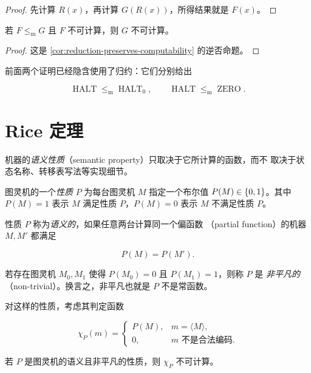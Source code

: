 \begin{proof}
  先计算 $R(x)$，再计算 $G(R(x))$，所得结果就是 $F(x)$。
\end{proof}

\begin{corollary}
  \label{cor:reduction-transfers-uncomputability}
  若 $F\leq_{\mathrm m}G$ 且 $F$ 不可计算，则 $G$ 不可计算。
\end{corollary}

\begin{proof}
  这是 \cref{cor:reduction-preserves-computability} 的逆否命题。
\end{proof}

前面两个证明已经隐含使用了归约：它们分别给出

\[
  \operatorname{HALT}\leq_{\mathrm m}\operatorname{HALT}_0,
  \qquad
  \operatorname{HALT}\leq_{\mathrm m}\operatorname{ZERO}.
\]

\section{Rice 定理}

机器的\emph{语义性质}（semantic property）只取决于它所计算的函数，而不
取决于状态名称、转移表写法等实现细节。

\begin{definition}
  \label{def:semantic-nontrivial-property}
  图灵机的一个\emph{性质} $P$ 为每台图灵机 $M$ 指定一个布尔值
  $P(M)\in\{0,1\}$。其中 $P(M)=1$ 表示 $M$ 满足性质 $P$，$P(M)=0$ 表示
  $M$ 不满足性质 $P$。

  性质 $P$ 称为\emph{语义的}，如果任意两台计算同一个偏函数
  （partial function）的机器 $M,M'$ 都满足

  \[
    P(M)=P(M').
  \]

  若存在图灵机 $M_0,M_1$ 使得 $P(M_0)=0$ 且 $P(M_1)=1$，则称 $P$ 是
  \emph{非平凡的}（non-trivial）。换言之，非平凡也就是 $P$ 不是常函数。
\end{definition}

对这样的性质，考虑其判定函数

\[
  \chi_P(m)=
  \begin{cases}
    P(M),&m=\langle M\rangle,\\
    0,&m\text{ 不是合法编码}.
  \end{cases}
\]

\begin{theorem}[Rice 定理]
  \label{thm:rice}
  若 $P$ 是图灵机的语义且非平凡的性质，则 $\chi_P$ 不可计算。
\end{theorem}

